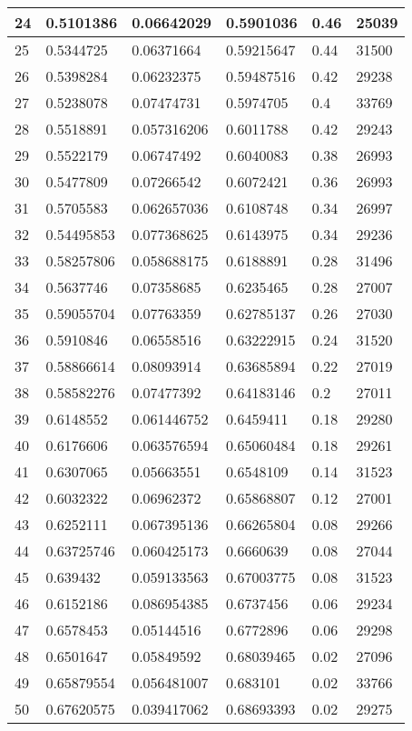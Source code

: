 \begin{longtable}{|l|l|l|l|l|l|}
24 & 0.5101386 & 0.06642029 & 0.5901036 & 0.46 & 25039 \\ \hline 
25 & 0.5344725 & 0.06371664 & 0.59215647 & 0.44 & 31500 \\ \hline 
26 & 0.5398284 & 0.06232375 & 0.59487516 & 0.42 & 29238 \\ \hline 
27 & 0.5238078 & 0.07474731 & 0.5974705 & 0.4 & 33769 \\ \hline 
28 & 0.5518891 & 0.057316206 & 0.6011788 & 0.42 & 29243 \\ \hline 
29 & 0.5522179 & 0.06747492 & 0.6040083 & 0.38 & 26993 \\ \hline 
30 & 0.5477809 & 0.07266542 & 0.6072421 & 0.36 & 26993 \\ \hline 
31 & 0.5705583 & 0.062657036 & 0.6108748 & 0.34 & 26997 \\ \hline 
32 & 0.54495853 & 0.077368625 & 0.6143975 & 0.34 & 29236 \\ \hline 
33 & 0.58257806 & 0.058688175 & 0.6188891 & 0.28 & 31496 \\ \hline 
34 & 0.5637746 & 0.07358685 & 0.6235465 & 0.28 & 27007 \\ \hline 
35 & 0.59055704 & 0.07763359 & 0.62785137 & 0.26 & 27030 \\ \hline 
36 & 0.5910846 & 0.06558516 & 0.63222915 & 0.24 & 31520 \\ \hline 
37 & 0.58866614 & 0.08093914 & 0.63685894 & 0.22 & 27019 \\ \hline 
38 & 0.58582276 & 0.07477392 & 0.64183146 & 0.2 & 27011 \\ \hline 
39 & 0.6148552 & 0.061446752 & 0.6459411 & 0.18 & 29280 \\ \hline 
40 & 0.6176606 & 0.063576594 & 0.65060484 & 0.18 & 29261 \\ \hline 
41 & 0.6307065 & 0.05663551 & 0.6548109 & 0.14 & 31523 \\ \hline 
42 & 0.6032322 & 0.06962372 & 0.65868807 & 0.12 & 27001 \\ \hline 
43 & 0.6252111 & 0.067395136 & 0.66265804 & 0.08 & 29266 \\ \hline 
44 & 0.63725746 & 0.060425173 & 0.6660639 & 0.08 & 27044 \\ \hline 
45 & 0.639432 & 0.059133563 & 0.67003775 & 0.08 & 31523 \\ \hline 
46 & 0.6152186 & 0.086954385 & 0.6737456 & 0.06 & 29234 \\ \hline 
47 & 0.6578453 & 0.05144516 & 0.6772896 & 0.06 & 29298 \\ \hline 
48 & 0.6501647 & 0.05849592 & 0.68039465 & 0.02 & 27096 \\ \hline 
49 & 0.65879554 & 0.056481007 & 0.683101 & 0.02 & 33766 \\ \hline 
50 & 0.67620575 & 0.039417062 & 0.68693393 & 0.02 & 29275 \\ \hline 
\end{longtable}